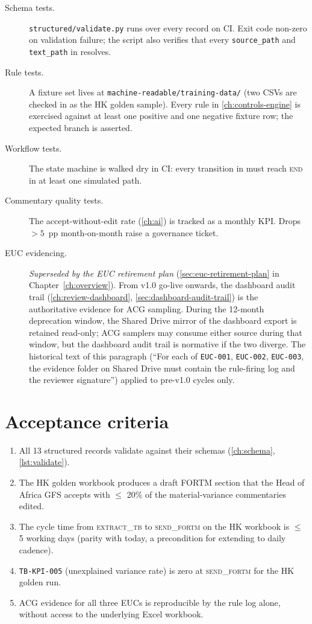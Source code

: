 \documentclass[11pt,a4paper,twoside]{report}
\newcommand{\corpus}{}
\newcommand{\stateid}[1]{\textsc{\lowercase{#1}}}
\begin{document}
\begin{description}
\item[Schema tests.] \corpus\texttt{structured/validate.py} runs
over every record on CI. Exit code non-zero on validation
failure; the script also verifies that every \texttt{source\_path}
and \texttt{text\_path} in  resolves.
\item[Rule tests.] A fixture set lives at
\corpus\texttt{machine-readable/training-data/} (two CSVs are
checked in as the HK golden sample). Every rule in
\cref{ch:controls-engine} is exercised against at least one
positive and one negative fixture row; the expected branch is
asserted.
\item[Workflow tests.] The state machine is walked dry in CI: every
transition in  must reach
\stateid{END} in at least one simulated path.
\item[Commentary quality tests.] The accept-without-edit rate
(\cref{ch:ai}) is tracked as a monthly KPI. Drops $> 5$~pp
month-on-month raise a governance ticket.
\item[EUC evidencing.]\label{sec:controls-eucs}
\emph{Superseded by the EUC retirement plan}
(\cref{sec:euc-retirement-plan} in
Chapter~\ref{ch:overview}). From v1.0 go-live onwards, the
dashboard audit trail
(\cref{ch:review-dashboard}, \cref{sec:dashboard-audit-trail}) is the
authoritative evidence for ACG sampling. During the 12-month
deprecation window, the Shared Drive mirror of the dashboard
export is retained read-only; ACG samplers may consume either
source during that window, but the dashboard audit trail is
normative if the two diverge. The historical text of this
paragraph (``For each of \texttt{EUC-001}, \texttt{EUC-002},
\texttt{EUC-003}, the evidence folder on Shared Drive must
contain the rule-firing log and the reviewer signature'')
applied to pre-v1.0 cycles only.
\end{description}

\section{Acceptance criteria}

\begin{enumerate}
\item All 13 structured records validate against their schemas
(\cref{ch:schema}, \cref{lst:validate}).
\item The HK golden workbook produces a draft FORTM section that
the Head of Africa GFS accepts with $\le$ 20\% of the
material-variance commentaries edited.
\item The cycle time from \stateid{EXTRACT\_TB} to
\stateid{SEND\_FORTM} on the HK workbook is $\le$ 5 working
days (parity with today, a precondition for extending to daily
cadence).
\item \texttt{TB-KPI-005} (unexplained variance rate) is zero at
\stateid{SEND\_FORTM} for the HK golden run.
\item ACG evidence for all three EUCs is reproducible by the rule
log alone, without access to the underlying Excel workbook.
\end{enumerate}
\end{document}
